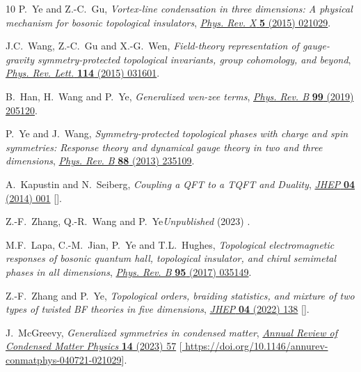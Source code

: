 \documentclass[11pt,nofootinbib,preprint]{revtex4-1}
\begin{document}
\begin{thebibliography}{10}
P.~Ye and Z.-C.~Gu, \emph{Vortex-line condensation in three dimensions: A
  physical mechanism for bosonic topological insulators},
  \href{https://doi.org/10.1103/PhysRevX.5.021029}{\emph{Phys. Rev. X}
  {\bfseries 5} (2015) 021029}.

J.C.~Wang, Z.-C.~Gu and X.-G.~Wen, \emph{Field-theory representation of
  gauge-gravity symmetry-protected topological invariants, group cohomology,
  and beyond},
  \href{https://doi.org/10.1103/PhysRevLett.114.031601}{\emph{Phys. Rev. Lett.}
  {\bfseries 114} (2015) 031601}.

B.~Han, H.~Wang and P.~Ye, \emph{Generalized wen-zee terms},
  \href{https://doi.org/10.1103/PhysRevB.99.205120}{\emph{Phys. Rev. B}
  {\bfseries 99} (2019) 205120}.

P.~Ye and J.~Wang, \emph{Symmetry-protected topological phases with charge and
  spin symmetries: Response theory and dynamical gauge theory in two and three
  dimensions}, \href{https://doi.org/10.1103/PhysRevB.88.235109}{\emph{Phys.
  Rev. B} {\bfseries 88} (2013) 235109}.

A.~Kapustin and N.~Seiberg, \emph{{Coupling a QFT to a TQFT and Duality}},
  \href{https://doi.org/10.1007/JHEP04(2014)001}{\emph{JHEP} {\bfseries 04}
  (2014) 001} [\href{https://arxiv.org/abs/1401.0740}{{}}].

Z.-F.~Zhang, Q.-R.~Wang and P.~Ye{\emph{Unpublished} (2023) }.

M.F.~Lapa, C.-M.~Jian, P.~Ye and T.L.~Hughes, \emph{Topological electromagnetic
  responses of bosonic quantum hall, topological insulator, and chiral
  semimetal phases in all dimensions},
  \href{https://doi.org/10.1103/PhysRevB.95.035149}{\emph{Phys. Rev. B}
  {\bfseries 95} (2017) 035149}.

Z.-F.~Zhang and P.~Ye, \emph{{Topological orders, braiding statistics, and
  mixture of two types of twisted BF theories in five dimensions}},
  \href{https://doi.org/10.1007/JHEP04(2022)138}{\emph{JHEP} {\bfseries 04}
  (2022) 138} [\href{https://arxiv.org/abs/2104.07067}{{}}].

J.~McGreevy, \emph{Generalized symmetries in condensed matter},
  \href{https://doi.org/10.1146/annurev-conmatphys-040721-021029}{\emph{Annual
  Review of Condensed Matter Physics} {\bfseries 14} (2023) 57}
  [\href{https://arxiv.org/abs/https://doi.org/10.1146/annurev-conmatphys-040721-021029}{{\ttfamily
  https://doi.org/10.1146/annurev-conmatphys-040721-021029}}].

\end{thebibliography}
\end{document}
